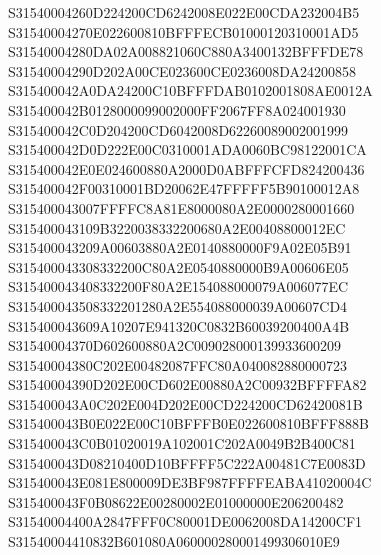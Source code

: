 \documentclass[12pt,a4paper]{article}
\begin{document}
\begin{framed}
{S31540004260D224200CD6242008E022E00CDA232004B5\newline
S31540004270E022600810BFFFECB01000120310001AD5\newline
S31540004280DA02A008821060C880A3400132BFFFDE78\newline
S31540004290D202A00CE023600CE0236008DA24200858\newline
S315400042A0DA24200C10BFFFDAB0102001808AE0012A\newline
S315400042B0128000099002000FF2067FF8A024001930\newline
S315400042C0D204200CD6042008D62260089002001999\newline
S315400042D0D222E00C0310001ADA0060BC98122001CA\newline
S315400042E0E024600880A2000D0ABFFFCFD824200436\newline
S315400042F00310001BD20062E47FFFFF5B90100012A8\newline
S315400043007FFFFC8A81E8000080A2E0000280001660\newline
S315400043109B3220038332200680A2E00408800012EC\newline
S315400043209A00603880A2E0140880000F9A02E05B91\newline
S315400043308332200C80A2E0540880000B9A00606E05\newline
S315400043408332200F80A2E154088000079A006077EC\newline
S315400043508332201280A2E554088000039A00607CD4\newline
S315400043609A10207E941320C0832B60039200400A4B\newline
S31540004370D602600880A2C009028000139933600209\newline
S31540004380C202E00482087FFC80A040082880000723\newline
S31540004390D202E00CD602E00880A2C00932BFFFFA82\newline
S315400043A0C202E004D202E00CD224200CD62420081B\newline
S315400043B0E022E00C10BFFFB0E022600810BFFF888B\newline
S315400043C0B01020019A102001C202A0049B2B400C81\newline
S315400043D08210400D10BFFFF5C222A00481C7E0083D\newline
S315400043E081E800009DE3BF987FFFFEABA41020004C\newline
S315400043F0B08622E00280002E01000000E206200482\newline
S31540004400A2847FFF0C80001DE0062008DA14200CF1\newline
S31540004410832B601080A060000280001499306010E9\newline
}
\end{framed}
\end{document}
